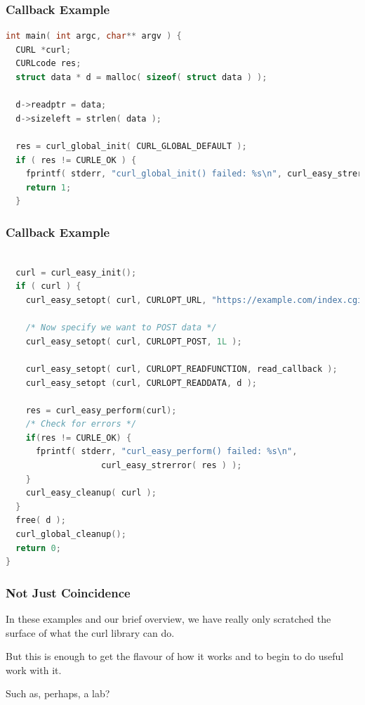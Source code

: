 \begin{frame}[fragile]
	\frametitle{Callback Example}
	\begin{lstlisting}[language=C]
int main( int argc, char** argv ) {
  CURL *curl;
  CURLcode res;
  struct data * d = malloc( sizeof( struct data ) );
 
  d->readptr = data;
  d->sizeleft = strlen( data );
 
  res = curl_global_init( CURL_GLOBAL_DEFAULT );
  if ( res != CURLE_OK ) {
    fprintf( stderr, "curl_global_init() failed: %s\n", curl_easy_strerror( res ) );
    return 1;
  }
\end{lstlisting}

\end{frame}



\begin{frame}[fragile]
	\frametitle{Callback Example}
	\begin{lstlisting}[language=C]
 
  curl = curl_easy_init();
  if ( curl ) {
    curl_easy_setopt( curl, CURLOPT_URL, "https://example.com/index.cgi" );
 
    /* Now specify we want to POST data */ 
    curl_easy_setopt( curl, CURLOPT_POST, 1L );
 
    curl_easy_setopt( curl, CURLOPT_READFUNCTION, read_callback );
    curl_easy_setopt (curl, CURLOPT_READDATA, d );
 
    res = curl_easy_perform(curl);
    /* Check for errors */ 
    if(res != CURLE_OK) {
      fprintf( stderr, "curl_easy_perform() failed: %s\n",
                   curl_easy_strerror( res ) );
    }  
    curl_easy_cleanup( curl );
  }
  free( d );
  curl_global_cleanup();
  return 0;
}
\end{lstlisting}

\end{frame}



\begin{frame}
	\frametitle{Not Just Coincidence}

	In these examples and our brief overview, we have really only scratched the surface of what the curl library can do.

	But this is enough to get the flavour of how it works and to begin to do useful work with it.

	Such as, perhaps, a lab?


\end{frame}




